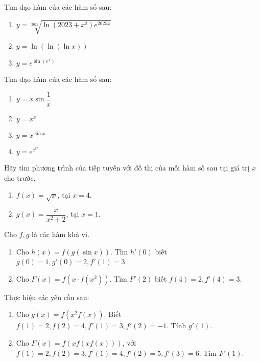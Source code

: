 \begin{exercise}
    Tìm đạo hàm của các hàm số sau:
    \begin{enumerate}[label=(\alph*)]
        \item $y = \sqrt[2024]{\ln(2023+x^2)e^{2025x}}$
        \item $y = \ln(\ln(\ln x))$
        \item $y = e^{\sin(e^x)}$
    \end{enumerate}
\end{exercise}

\begin{exercise}
    Tìm đạo hàm của các hàm số sau:
    \begin{enumerate}[label=(\alph*)]
        \item $y = x \sin\dfrac{1}{x}$
        \item $y = x^x$
        \item $y = x^{\sin x}$
        \item $y = e^{e^{e^x}}$
    \end{enumerate}
\end{exercise}

\begin{exercise}
    Hãy tìm phương trình của tiếp tuyến với đồ thị của mỗi hàm số sau tại giá trị $x$ cho trước.
    \begin{enumerate}[label=(\alph*)]
        \item $f(x) = \sqrt{x}$, tại $x=4$.
        \item $g(x) = \dfrac{x}{x^2+2}$, tại $x=1$.
    \end{enumerate}
\end{exercise}

\begin{exercise}
    Cho $f, g$ là các hàm khả vi.
    \begin{enumerate}[label=(\alph*)]
        \item Cho $h(x) = f(g(\sin x))$. Tìm $h'(0)$ biết $g(0)=1, g'(0)=2, f'(1)=3$.
        \item Cho $F(x) = f(x \cdot f(x^2))$. Tìm $F'(2)$ biết $f(4)=2, f'(4)=3$.
    \end{enumerate}
\end{exercise}

\begin{exercise} Thực hiện các yêu cầu sau:
    \begin{enumerate}[label=(\alph*)]
        \item Cho $g(x) = f(x^2 f(x))$. Biết $f(1)=2, f(2)=4, f'(1)=3, f'(2)=-1$. Tính $g'(1)$.
        \item Cho $F(x) = f(x f(x f(x)))$, với $f(1)=2, f(2)=3, f'(1)=4, f'(2)=5, f'(3)=6$. Tìm $F'(1)$. %
    \end{enumerate}
\end{exercise}

